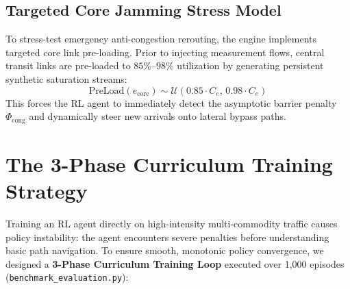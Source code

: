\documentclass[12pt,a4paper,oneside]{report}
\begin{document}
\subsection{Targeted Core Jamming Stress Model}
To stress-test emergency anti-congestion rerouting, the engine implements targeted core link pre-loading. Prior to injecting measurement flows, central transit links are pre-loaded to $85\%$--$98\%$ utilization by generating persistent synthetic saturation streams:
\begin{equation}
    \text{PreLoad}(e_{\text{core}}) \sim \mathcal{U}(0.85 \cdot C_e, \, 0.98 \cdot C_e)
\end{equation}
This forces the RL agent to immediately detect the asymptotic barrier penalty $\Phi_{\text{cong}}$ and dynamically steer new arrivals onto lateral bypass paths.

\section{The 3-Phase Curriculum Training Strategy}
Training an RL agent directly on high-intensity multi-commodity traffic causes policy instability: the agent encounters severe penalties before understanding basic path navigation. To ensure smooth, monotonic policy convergence, we designed a \textbf{3-Phase Curriculum Training Loop} executed over 1,000 episodes (\texttt{benchmark\_evaluation.py}):
\end{document}
